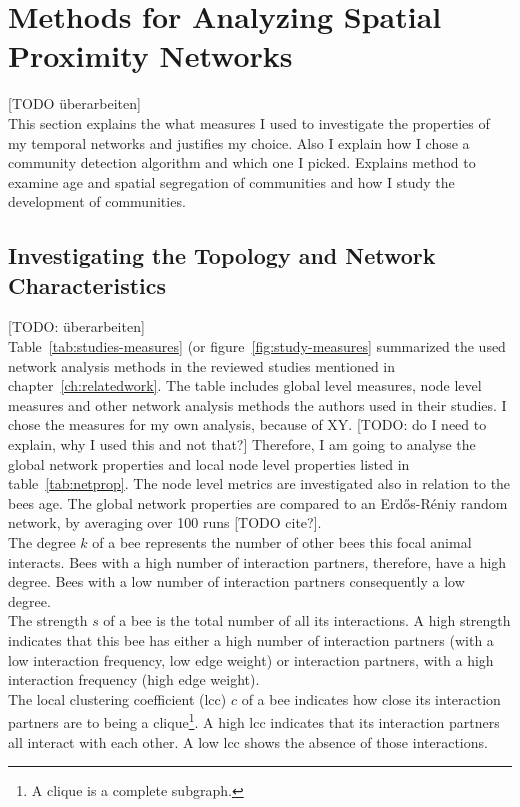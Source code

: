 \section{Methods for Analyzing Spatial Proximity Networks}
[TODO überarbeiten]\\
This section explains the what measures I used to investigate the properties of my temporal networks and justifies my choice. Also I explain how I chose a community detection algorithm and which one I picked. Explains method to examine age and spatial segregation of communities and how I study the development of communities.

\subsection{Investigating the Topology and Network Characteristics}
\label{subsec:APmeasures}
[TODO: überarbeiten]\\
Table~\ref{tab:studies-measures} (or figure~\ref{fig:study-measures} summarized the used network analysis methods in the reviewed studies mentioned in chapter~\ref{ch:relatedwork}. The table includes global level measures, node level measures and other network analysis methods the authors used in their studies.
I chose the measures for my own analysis, because of XY.
[TODO: do I need to explain, why I used this and not that?]
Therefore, I am going to analyse the global network properties and local node level properties listed in table~\ref{tab:netprop}.
The node level metrics are investigated also in relation to the bees age.
The global network properties are compared to an Erd\H{o}s-R\'{e}niy random network, by averaging over 100 runs [TODO cite?].\\

The degree $k$ of a bee represents the number of other bees this focal animal interacts.
Bees with a high number of interaction partners, therefore, have a high degree. Bees with a low number of interaction partners consequently a low degree.\\
The strength $s$ of a bee is the total number of all its interactions. A high strength indicates that this bee has either a high number of interaction partners (with a low interaction frequency, low edge weight) or interaction partners, with a high interaction frequency (high edge weight).\\
The local clustering coefficient (lcc) $c$ of a bee indicates how close its interaction partners are to being a clique\footnote{A clique is a complete subgraph.}. A high lcc indicates that its interaction partners all interact with each other. A low lcc shows the absence of those interactions.

